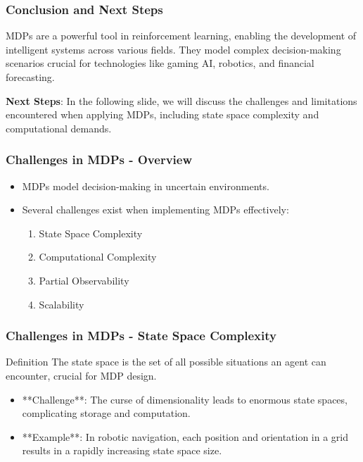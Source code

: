 \documentclass{beamer}
\begin{document}
\begin{frame}[fragile]
    \frametitle{Conclusion and Next Steps}
    MDPs are a powerful tool in reinforcement learning, enabling the development of intelligent systems across various fields. They model complex decision-making scenarios crucial for technologies like gaming AI, robotics, and financial forecasting.

    \textbf{Next Steps}: In the following slide, we will discuss the challenges and limitations encountered when applying MDPs, including state space complexity and computational demands.
\end{frame}

\begin{frame}[fragile]
    \frametitle{Challenges in MDPs - Overview}
    \begin{itemize}
        \item MDPs model decision-making in uncertain environments.
        \item Several challenges exist when implementing MDPs effectively:
        \begin{enumerate}
            \item State Space Complexity
            \item Computational Complexity
            \item Partial Observability
            \item Scalability
        \end{enumerate}
    \end{itemize}
\end{frame}

\begin{frame}[fragile]
    \frametitle{Challenges in MDPs - State Space Complexity}
    \begin{block}{Definition}
        The state space is the set of all possible situations an agent can encounter, crucial for MDP design.
    \end{block}
    \begin{itemize}
        \item **Challenge**: The curse of dimensionality leads to enormous state spaces, complicating storage and computation.
        \item **Example**: In robotic navigation, each position and orientation in a grid results in a rapidly increasing state space size.
    \end{itemize}
\end{frame}
\end{document}
